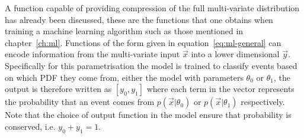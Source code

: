 A function capable of providing compression of the full multi-variate
distribution has already been discussed, these are the functions that one
obtains when training a machine learning algorithm such as those mentioned
in chapter~\ref{ch:ml}. Functions of the form given in
equation~\ref{eq:ml-general} can encode information from the multi-variate
input $\vec{x}$ into a lower dimensional $\vec{y}$. Specifically for this
parametrisation the model is trained to classify events based on which PDF they
come from, either the model with parameters $\theta_0$ or $\theta_1$, the output
is therefore written as $[y_0, y_1]$ where each term in the vector represents
the probability that an event comes from $p(\vec{x} | \theta_0)$ or $p(\vec{x} |
\theta_1)$ respectively. Note that the choice of output function in the model
ensure that probability is conserved, i.e. $y_0 + y_1 = 1$.









